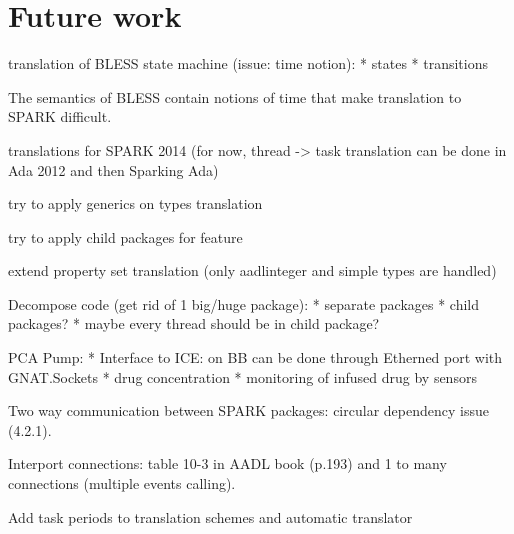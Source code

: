 
\cleardoublepage

\chapter{Future work}
\label{future_work}

translation of BLESS state machine (issue: time notion):
	* states
	* transitions

The semantics of BLESS contain notions of time that make translation to SPARK difficult.

translations for SPARK 2014 (for now, thread -> task translation can be done in Ada 2012 and then Sparking Ada)

try to apply generics on types translation

try to apply child packages for feature 

extend property set translation (only aadlinteger and simple types are handled)

Decompose code (get rid of 1 big/huge package):
* separate packages
* child packages?
* maybe every thread should be in child package?

PCA Pump:
* Interface to ICE: on BB can be done through Etherned port with GNAT.Sockets
* drug concentration
* monitoring of infused drug by sensors

Two way communication between SPARK packages: circular dependency issue (4.2.1).

Interport connections: table 10-3 in AADL book (p.193) and 1 to many connections (multiple events calling).

Add task periods to translation schemes and automatic translator

